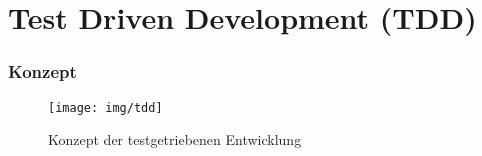 
\section{Test Driven Development (TDD)}

\begin{frame}
  \frametitle{Konzept}

  \begin{figure}
    \texttt{[image: img/tdd]}
    \centering
    \caption{Konzept der testgetriebenen Entwicklung}
    \label{img:tdd_concept}
  \end{figure}

\end{frame}
